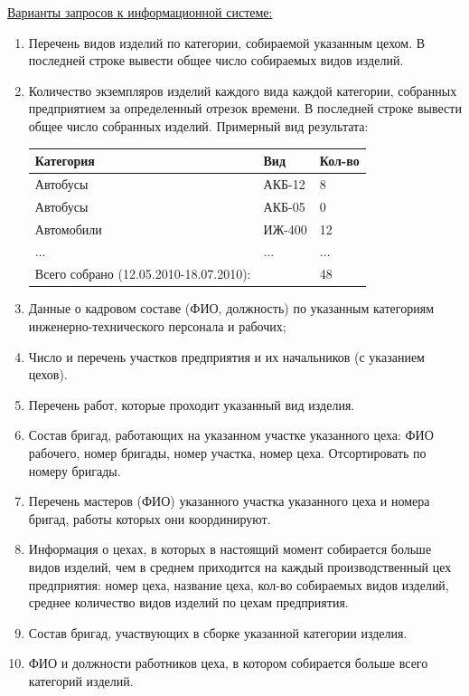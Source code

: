 \underline{Варианты запросов к информационной системе:}
\begin{enumerate}

    \item Перечень видов изделий по категории, собираемой указанным цехом.
    В последней строке вывести общее число собираемых видов изделий.

    \item Количество экземпляров изделий каждого вида каждой категории, собранных предприятием за определенный отрезок времени.
    В последней строке вывести общее число собранных изделий.
    Примерный вид результата:

    \begin{tabular}{|p{6cm}|p{2cm}|p{1cm}|} \hline
        Категория & Вид & Кол-во \\ \hline
        Автобусы & АКБ-12 & 8 \\ \hline
        Автобусы & АКБ-05 & 0 \\ \hline
        Автомобили & ИЖ-400 & 12 \\ \hline
        ... & ... & ... \\ \hline
        Всего собрано (12.05.2010-18.07.2010): & & 48 \\ \hline
    \end{tabular}

    \item Данные о кадровом составе (ФИО, должность) по указанным категориям инженерно-технического персонала и рабочих;
    \item Число и перечень участков предприятия и их начальников (с указанием цехов).
    \item Перечень работ, которые проходит указанный вид изделия.
    \item Состав бригад, работающих на указанном участке указанного цеха: ФИО рабочего, номер бригады, номер участка, номер цеха. Отсортировать по номеру бригады.
    \item Перечень мастеров (ФИО) указанного участка указанного цеха и номера бригад, работы которых они координируют.
    \item Информация о цехах, в которых в настоящий момент собирается больше видов изделий, чем в среднем приходится на каждый производственный цех предприятия: номер цеха, название цеха, кол-во собираемых видов изделий, среднее количество видов изделий по цехам предприятия.
    \item Состав бригад, участвующих в сборке указанной категории изделия.
    \item ФИО и должности работников цеха, в котором собирается больше всего категорий изделий.

\end{enumerate}

